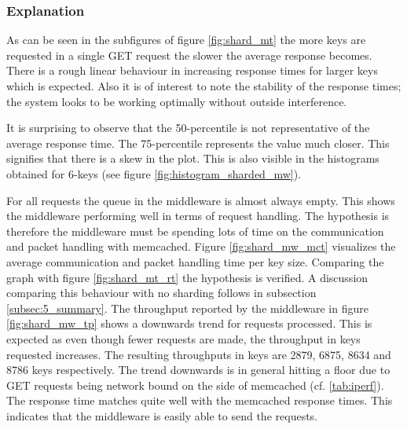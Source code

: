         \subsubsection{Explanation\label{subsubsec:5_sharded_summary}}

            As can be seen in the subfigures of figure \ref{fig:shard_mt} the more keys are requested in a single GET
            request the slower the average response becomes. There is a rough linear behaviour in increasing response
            times for larger keys which is expected. Also it is of interest to note the stability of the response times;
            the system looks to be working optimally without outside interference.

            It is surprising to observe that the 50-percentile is not representative of the average response time. The
            75-percentile represents the value much closer. This signifies that there is a skew in the plot. This is
            also visible in the histograms obtained for 6-keys (see figure \ref{fig:histogram_sharded_mw}).

            For all requests the queue in the middleware is almost always empty. This shows the middleware performing
            well in terms of request handling. The hypothesis is therefore the middleware must be spending lots of time
            on the communication and packet handling with memcached. Figure \ref{fig:shard_mw_mct} visualizes the
            average communication and packet handling time per key size. Comparing the graph with figure
            \ref{fig:shard_mt_rt} the hypothesis is verified. A discussion comparing this behaviour with no sharding
            follows in subsection \ref{subsec:5_summary}.\newline
            The throughput reported by the middleware in figure \ref{fig:shard_mw_tp} shows a downwards trend for
            requests processed. This is expected as even though fewer requests are made, the throughput in keys
            requested increases. The resulting throughputs in keys are 2879, 6875, 8634 and 8786 keys respectively. The
            trend downwards is in general hitting a floor due to GET requests being network bound on the side of
            memcached (cf. \ref{tab:iperf}).
            The response time matches quite well with the memcached response times. This indicates that the middleware
            is easily able to send the requests.

